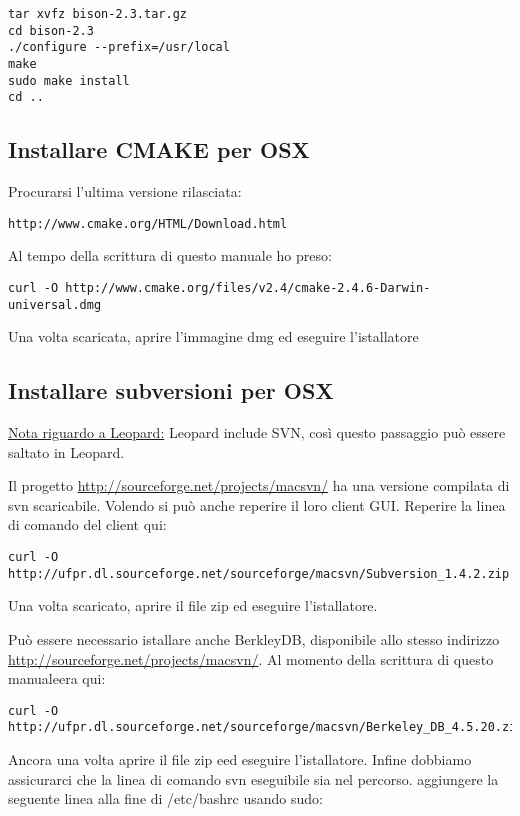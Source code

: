 \begin{verbatim}
tar xvfz bison-2.3.tar.gz 
cd bison-2.3 
./configure --prefix=/usr/local 
make
sudo make install 
cd ..  
\end{verbatim}

\subsection{Installare CMAKE per OSX}
Procurarsi l'ultima versione rilasciata:

\begin{verbatim}
http://www.cmake.org/HTML/Download.html 
\end{verbatim}

Al tempo della scrittura di questo manuale ho preso:

\begin{verbatim}
curl -O http://www.cmake.org/files/v2.4/cmake-2.4.6-Darwin-universal.dmg
\end{verbatim}

Una volta scaricata, aprire l'immagine dmg ed eseguire l'istallatore

\subsection{Installare subversioni per OSX}
\underline{Nota riguardo a Leopard:} Leopard include SVN, così questo passaggio può essere saltato in Leopard.

Il progetto \url{http://sourceforge.net/projects/macsvn/} ha una versione compilata di svn scaricabile. Volendo si può anche reperire il loro client GUI. Reperire la linea di comando del client qui:

\begin{verbatim}
curl -O http://ufpr.dl.sourceforge.net/sourceforge/macsvn/Subversion_1.4.2.zip 
\end{verbatim}

Una volta scaricato, aprire il file zip ed eseguire l'istallatore.

Può essere necessario istallare anche BerkleyDB, disponibile allo stesso indirizzo
\url{http://sourceforge.net/projects/macsvn/}. Al momento della scrittura di questo manualeera qui:

\begin{verbatim}
curl -O http://ufpr.dl.sourceforge.net/sourceforge/macsvn/Berkeley_DB_4.5.20.zip 
\end{verbatim}

Ancora una volta aprire il file zip eed eseguire l'istallatore. Infine dobbiamo assicurarci che la linea di comando svn eseguibile sia nel percorso. aggiungere la seguente linea alla fine di /etc/bashrc usando sudo:

